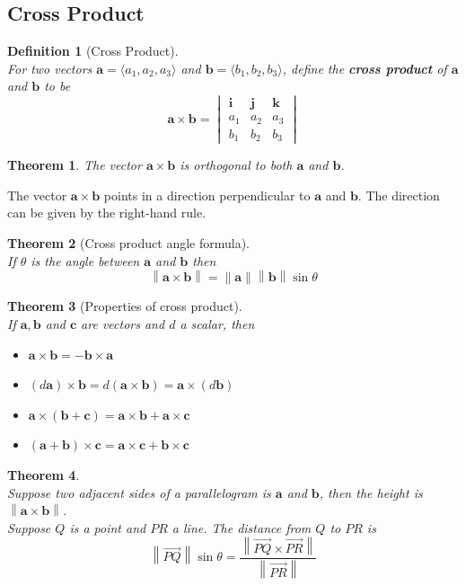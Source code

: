 \documentclass[12pt]{article}
\newcommand\norm[1]{\left\lVert#1\right\rVert}
\newtheorem{definition}{Definition}[section]
\newtheorem{theorem}{Theorem}[section]
\theoremstyle{definition}
\newcommand\ve[1]{\mathbf{#1}}
\begin{document}
\subsection{Cross Product}
\begin{definition}[Cross Product]
\hfill\\\normalfont For two vectors $\ve{a} = \langle a_1,a_2,a_3\rangle$ and $\ve{b} = \langle b_1,b_2,b_3\rangle$, define the \textbf{cross product} of $\ve{a}$ and $\ve{b}$ to be
\[
\ve{a}\times\ve{b}=\begin{vmatrix}
                    \ve{i}&\ve{j}&\ve{k}\\
                    a_1&a_2&a_3\\
                    b_1&b_2&b_3\end{vmatrix}
\] 
\end{definition}
\begin{theorem}\normalfont The vector $\ve{a}\times\ve{b}$ is orthogonal to both $\ve{a}$ and $\ve{b}$.
\end{theorem}
The vector $\ve{a}\times\ve{b}$ points in a direction perpendicular to $\ve{a}$ and $\ve{b}$. The direction can be given by the right-hand rule.
\begin{theorem}[Cross product angle formula]
\hfill\\\normalfont If $\theta$ is the angle between $\ve{a}$ and $\ve{b}$ then
\[
\norm{\ve{a}\times\ve{b}}=\norm{\ve{a}}\norm{\ve{b}}\sin\theta
\]
\end{theorem}
\begin{theorem}[Properties of cross product]
\hfill\\\normalfont If $\ve{a},\ve{b}$ and $\ve{c}$ are vectors and $d$ a scalar, then
\begin{itemize}
  \item $\ve{a}\times\ve{b} = -\ve{b}\times\ve{a}$
  \item $(d\ve{a})\times \ve{b} = d(\ve{a}\times\ve{b})=\ve{a}\times(d\ve{b})$
  \item $\ve{a}\times(\ve{b}+\ve{c})=\ve{a}\times\ve{b}+\ve{a}\times\ve{c}$
  \item $(\ve{a}+\ve{b})\times\ve{c}=\ve{a}\times\ve{c}+\ve{b}\times\ve{c}$
\end{itemize}
\end{theorem}
\begin{theorem}
\hfill\\\normalfont Suppose two adjacent sides of a parallelogram is $\ve{a}$ and $\ve{b}$, then the height is $\norm{\ve{a}\times\ve{b}}$.\\
Suppose $Q$ is a point and $PR$ a line. The distance from $Q$ to $PR$ is
\[
\norm{\overrightarrow{PQ}}\sin\theta = \frac{\norm{\overrightarrow{PQ}\times \overrightarrow{PR}}}{\norm{\overrightarrow{PR}}}
\]
\end{theorem}
\end{document}
